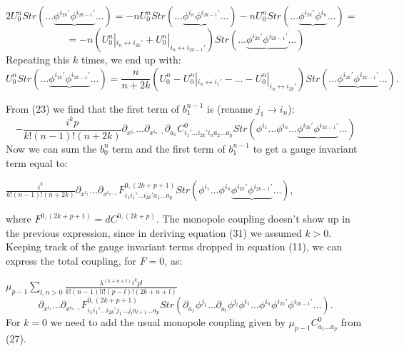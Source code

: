 \documentclass[a4paper,12pt]{article}
\begin{document}
$2U^n_0Str\left(\ldots \underbrace{\phi^{i_{2k}'}\phi^{i_{2k-1}'}}\ldots \right)=-nU^n_0Str\left(\ldots \underbrace{\phi^{i_n}\phi^{i_{2k-1}'}}\ldots \right)-n U^n_0Str\left(\ldots \underbrace{\phi^{i_{2k}'}\phi^{i_n}}\ldots \right)=$
\begin{equation}
=-n( U^n_0|_{i_n\leftrightarrow i_{2k}'}+U^n_0|_{i_n\leftrightarrow i_{2k-1}'})Str\left(\ldots \underbrace{\phi^{i_{2k}'}\phi^{i_{2k-1}'}}\ldots \right)
\end{equation}
Repeating this $k$ times, we end up with:
\begin{equation}
U^n_0Str\left(\ldots \underbrace{\phi^{i_{2k}'}\phi^{i_{2k-1}'}}\ldots \right)=\frac{n}{n+2k}(U^n_0-U^n_0|_{i_n\leftrightarrow i_1'}-\ldots -U^n_0|_{i_n\leftrightarrow i_{2k}'})Str\left(\ldots \underbrace{\phi^{i_{2k}'}\phi^{i_{2k-1}'}}\ldots \right).
\end{equation}  

From (23) we find that the first term of $b^{n-1}_1$ is (rename $j_1\rightarrow i_n$):
\begin{equation}
-\frac{i^k p}{k!(n-1)!(n+2k)} \partial_{x^{i_1}}\ldots \partial_{x^{i_{n-1}}}\partial_{a_1} C^0_{i_1'\ldots i_{2k}'{i_n}a_2\ldots a_p}Str\left(\phi^{i_1}\ldots \phi^{i_n}\ldots \underbrace{\phi^{i_{2k}'}\phi^{i_{2k-1}'}}\ldots \right)
\end{equation}
 Now we can sum the $b^n_0$ term and the first term of $b^{n-1}_1$ to get a gauge invariant term equal to:
\begin{center}
$ \frac{i^k}{k!(n-1)!(n+2k)}\partial_{x^{i_1}}\ldots \partial_{x^{i_{n-1}}} F^{0,(2k+p+1)}_{i_1i_1'\ldots i_{2k}'a_1\ldots a_p}Str\left(\phi^{i_1}\ldots \phi^{i_n}\underbrace{\phi^{i_{2k}'}\phi^{i_{2k-1}'}} \ldots \right)$, 
\end{center}
where  $F^{0,(2k+p+1)}= dC^{0,(2k+p)}$.  The monopole coupling doesn't show up in the previous expression, since in deriving equation (31) we assumed $k>0$.
Keeping track of the gauge invariant terms dropped in equation (11), we can express the total coupling, for $F=0$, as:\newline


$\mu_{p-1}\sum_{l,n>0}\frac{\lambda^{(k+n+l)}i^kp!}{k!(n-1)!l!(p-l)!(2k+n+l)}$
\begin{equation}
\partial_{x^{i_1}}\ldots \partial_{x^{i_{n-1}}} F^{0,(2k+p+1)}_{i_1i_1'\ldots i_{2k}'j_1\ldots j_la_{l+1}\ldots a_p}Str\left(\partial_{a_1}\phi^{j_1}\ldots \partial_{a_l}\phi^{j_l}\phi^{i_1}\ldots \phi^{i_n}\phi^{i_{2k}'}\phi^{i_{2k-1}'}\ldots \right). 
\end{equation}
For $k=0$ we need to add the usual monopole coupling given by $\mu_{p-1}C^0_{a_1\ldots a_p}$ from (27).
\end{document}
